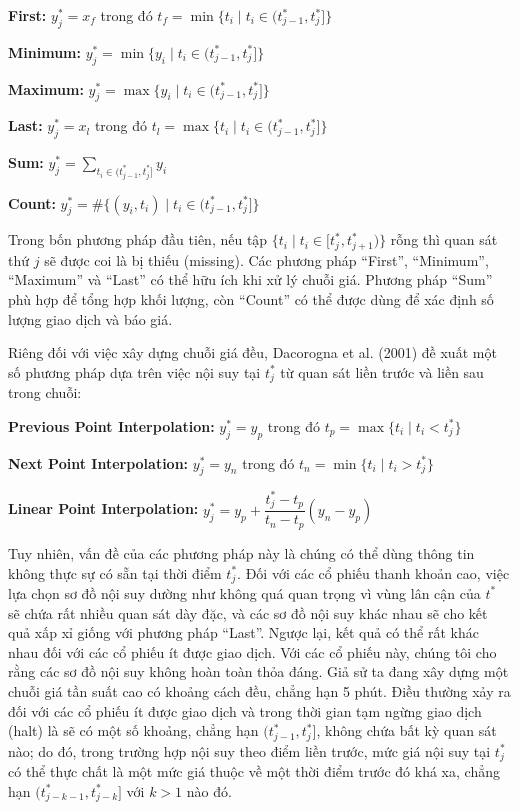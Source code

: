 \textbf{First:} $y_j^{*} = x_f$ trong đó $t_f = \min\{t_i \mid t_i \in (t_{j-1}^{*}, t_j^{*}]\}$

\textbf{Minimum:} $y_j^{*} = \min\{y_i \mid t_i \in (t_{j-1}^{*}, t_j^{*}]\}$

\textbf{Maximum:} $y_j^{*} = \max\{y_i \mid t_i \in (t_{j-1}^{*}, t_j^{*}]\}$

\textbf{Last:} $y_j^{*} = x_l$ trong đó $t_l = \max\{t_i \mid t_i \in (t_{j-1}^{*}, t_j^{*}]\}$

\textbf{Sum:} $y_j^{*} = \sum_{t_i \in (t_{j-1}^{*}, t_j^{*}]} y_i$

\textbf{Count:} $y_j^{*} = \#\{(y_i,t_i) \mid t_i \in (t_{j-1}^{*}, t_j^{*}]\}$

Trong bốn phương pháp đầu tiên, nếu tập $\{t_i \mid t_i \in [t_j^{*}, t_{j+1}^{*})\}$ rỗng thì quan sát thứ $j$ sẽ được coi là bị thiếu (missing). Các phương pháp ``First'', ``Minimum'', ``Maximum'' và ``Last'' có thể hữu ích khi xử lý chuỗi giá. Phương pháp ``Sum'' phù hợp để tổng hợp khối lượng, còn ``Count'' có thể được dùng để xác định số lượng giao dịch và báo giá.

Riêng đối với việc xây dựng chuỗi giá đều, Dacorogna et al. (2001) đề xuất một số phương pháp dựa trên việc nội suy tại $t_j^{*}$ từ quan sát liền trước và liền sau trong chuỗi:

\textbf{Previous Point Interpolation:} $y_j^{*} = y_p$ trong đó $t_p = \max\{t_i \mid t_i < t_j^{*}\}$

\textbf{Next Point Interpolation:} $y_j^{*} = y_n$ trong đó $t_n = \min\{t_i \mid t_i > t_j^{*}\}$

\textbf{Linear Point Interpolation:} $y_j^{*} = y_p + \dfrac{t_j^{*} - t_p}{t_n - t_p}(y_n - y_p)$

Tuy nhiên, vấn đề của các phương pháp này là chúng có thể dùng thông tin không thực sự có sẵn tại thời điểm $t_j^{*}$. Đối với các cổ phiếu thanh khoản cao, việc lựa chọn sơ đồ nội suy dường như không quá quan trọng vì vùng lân cận của $t^{*}$ sẽ chứa rất nhiều quan sát dày đặc, và các sơ đồ nội suy khác nhau sẽ cho kết quả xấp xỉ giống với phương pháp ``Last''. Ngược lại, kết quả có thể rất khác nhau đối với các cổ phiếu ít được giao dịch. Với các cổ phiếu này, chúng tôi cho rằng các sơ đồ nội suy không hoàn toàn thỏa đáng. Giả sử ta đang xây dựng một chuỗi giá tần suất cao có khoảng cách đều, chẳng hạn 5 phút. Điều thường xảy ra đối với các cổ phiếu ít được giao dịch và trong thời gian tạm ngừng giao dịch (halt) là sẽ có một số khoảng, chẳng hạn $(t_{j-1}^{*}, t_j^{*}]$, không chứa bất kỳ quan sát nào; do đó, trong trường hợp nội suy theo điểm liền trước, mức giá nội suy tại $t_j^{*}$ có thể thực chất là một mức giá thuộc về một thời điểm trước đó khá xa, chẳng hạn $(t_{j-k-1}^{*}, t_{j-k}^{*}]$ với $k>1$ nào đó.


